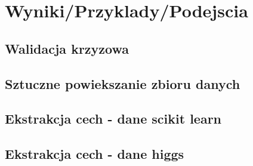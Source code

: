 \section{Wyniki/Przyklady/Podejscia}
\subsection{Walidacja krzyzowa}
\subsection{Sztuczne powiekszanie zbioru danych}
\subsection{Ekstrakcja cech - dane scikit learn}
\subsection{Ekstrakcja cech - dane higgs}
